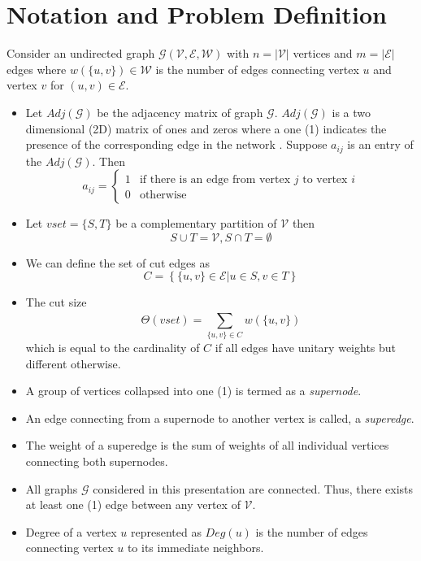 \documentclass[longpaper, english, final, times]{revdetua}
\begin{document}
	\section{Notation and Problem Definition}
		Consider an undirected graph $\mathcal{G(V,E,W)}$ with $n=|\mathcal{\mathcal{V}}|$ vertices and $m=|\mathcal{E}|$ edges where $w(\{u,v\}) \in \mathcal{W}$ is the number of edges connecting vertex $u$ and vertex $v$ for $(u,v)\in \mathcal{E}$. 
		\begin{itemize}
			\item Let $Adj(\mathcal{G})$ be the adjacency matrix of graph $\mathcal{G}$. $Adj(\mathcal{G})$ is a two dimensional (2D) matrix of ones and zeros where a one (1) indicates the presence of the corresponding edge in the network \cite{adjacencymatrixdefinition}. Suppose $a_{ij}$ is an entry of the $Adj(\mathcal{G})$. Then
			\[
				a_{ij} = 
				\begin{cases} 
					1 & \text{if there is an edge from vertex } j \text{ to vertex } i \\
					0 & \text{otherwise} 
				\end{cases}
			\] 
			\item Let  $vset=\{S, T\}	$ be a complementary partition of $\mathcal{V}$ then
					\[
						S\cup T = \mathcal{V} , S\cap T=\emptyset
					\]
			\item We can define the set of cut edges as
				\[
					C=\left\{\{u,v\} \in \mathcal{E} | u \in S, v \in T \right\}
				\]
			\item The cut size 
				\[
					\Theta(vset) = \sum_{\{u,v\}\in C}^{} w(\{u,v\})
				\]
				which is equal to the cardinality of $C$ if all edges have unitary weights but different otherwise.
			\item A group of vertices collapsed into one (1) is termed as a \textit{supernode}.
			\item An edge connecting from a supernode to another vertex is called, a \textit{superedge}.
			\item The weight of a superedge is the sum of weights of all individual vertices connecting both supernodes. 
			\item All graphs $\mathcal{G}$ considered in this presentation are connected. Thus, there exists at least one (1) edge between any vertex of $\mathcal{V}$. 
			\item Degree of a vertex $u$ represented as $Deg(u)$ is the number of edges connecting vertex $u$ to its immediate neighbors.
		\end{itemize}
	
\end{document}
